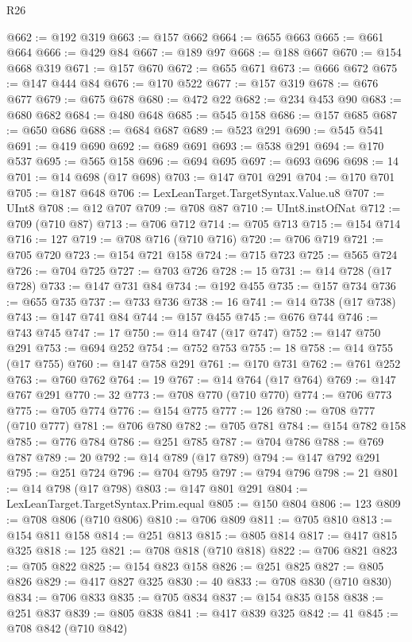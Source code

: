 \begin{lexlean}{R26}
\begin{coremodule}
@662 := @192 @319
@663 := @157 @662
@664 := @655 @663
@665 := @661 @664
@666 := @429 @84
@667 := @189 @97
@668 := @188 @667
@670 := @154 @668 @319
@671 := @157 @670
@672 := @655 @671
@673 := @666 @672
@675 := @147 @444 @84
@676 := @170 @522
@677 := @157 @319
@678 := @676 @677
@679 := @675 @678
@680 := @472 @22
@682 := @234 @453 @90
@683 := @680 @682
@684 := @480 @648
@685 := @545 @158
@686 := @157 @685
@687 := @650 @686
@688 := @684 @687
@689 := @523 @291
@690 := @545 @541
@691 := @419 @690
@692 := @689 @691
@693 := @538 @291
@694 := @170 @537
@695 := @565 @158
@696 := @694 @695
@697 := @693 @696
@698 := 14
@701 := @14 @698 (@17 @698)
@703 := @147 @701 @291
@704 := @170 @701
@705 := @187 @648
@706 := LexLeanTarget.TargetSyntax.Value.u8
@707 := UInt8
@708 := @12 @707
@709 := @708 @87
@710 := UInt8.instOfNat
@712 := @709 (@710 @87)
@713 := @706 @712
@714 := @705 @713
@715 := @154 @714
@716 := 127
@719 := @708 @716 (@710 @716)
@720 := @706 @719
@721 := @705 @720
@723 := @154 @721 @158
@724 := @715 @723
@725 := @565 @724
@726 := @704 @725
@727 := @703 @726
@728 := 15
@731 := @14 @728 (@17 @728)
@733 := @147 @731 @84
@734 := @192 @455
@735 := @157 @734
@736 := @655 @735
@737 := @733 @736
@738 := 16
@741 := @14 @738 (@17 @738)
@743 := @147 @741 @84
@744 := @157 @455
@745 := @676 @744
@746 := @743 @745
@747 := 17
@750 := @14 @747 (@17 @747)
@752 := @147 @750 @291
@753 := @694 @252
@754 := @752 @753
@755 := 18
@758 := @14 @755 (@17 @755)
@760 := @147 @758 @291
@761 := @170 @731
@762 := @761 @252
@763 := @760 @762
@764 := 19
@767 := @14 @764 (@17 @764)
@769 := @147 @767 @291
@770 := 32
@773 := @708 @770 (@710 @770)
@774 := @706 @773
@775 := @705 @774
@776 := @154 @775
@777 := 126
@780 := @708 @777 (@710 @777)
@781 := @706 @780
@782 := @705 @781
@784 := @154 @782 @158
@785 := @776 @784
@786 := @251 @785
@787 := @704 @786
@788 := @769 @787
@789 := 20
@792 := @14 @789 (@17 @789)
@794 := @147 @792 @291
@795 := @251 @724
@796 := @704 @795
@797 := @794 @796
@798 := 21
@801 := @14 @798 (@17 @798)
@803 := @147 @801 @291
@804 := LexLeanTarget.TargetSyntax.Prim.equal
@805 := @150 @804
@806 := 123
@809 := @708 @806 (@710 @806)
@810 := @706 @809
@811 := @705 @810
@813 := @154 @811 @158
@814 := @251 @813
@815 := @805 @814
@817 := @417 @815 @325
@818 := 125
@821 := @708 @818 (@710 @818)
@822 := @706 @821
@823 := @705 @822
@825 := @154 @823 @158
@826 := @251 @825
@827 := @805 @826
@829 := @417 @827 @325
@830 := 40
@833 := @708 @830 (@710 @830)
@834 := @706 @833
@835 := @705 @834
@837 := @154 @835 @158
@838 := @251 @837
@839 := @805 @838
@841 := @417 @839 @325
@842 := 41
@845 := @708 @842 (@710 @842)

\end{coremodule}
\end{lexlean}
